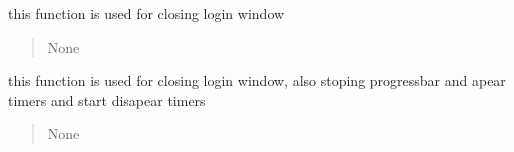 \documentclass[letterpaper,10pt,english]{sphinxmanual}
\begin{document}
\begin{savenotes}
\begin{fulllineitems}
\begin{savenotes}
\begin{fulllineitems}
\end{fulllineitems}\end{savenotes}


\begin{savenotes}\begin{fulllineitems}
\label{\detokenize{setting/notif_UI:oxin.notif_UI.UI_main_window.check_appear_done}}
\pysigstartsignatures
{}
\pysigstopsignatures
\end{fulllineitems}\end{savenotes}


\begin{savenotes}\begin{fulllineitems}
\label{\detokenize{setting/notif_UI:oxin.notif_UI.UI_main_window.close_win}}
\pysigstartsignatures
{}
\pysigstopsignatures
\sphinxAtStartPar
this function is used for closing login window
\begin{quote}\begin{description}
\sphinxAtStartPar
None

\end{description}\end{quote}

\end{fulllineitems}\end{savenotes}


\begin{savenotes}\begin{fulllineitems}
\label{\detokenize{setting/notif_UI:oxin.notif_UI.UI_main_window.close_win_2}}
\pysigstartsignatures
{}
\pysigstopsignatures
\sphinxAtStartPar
this function is used for closing login window, also stoping progressbar and apear timers and start disapear timers
\begin{quote}\begin{description}
\sphinxAtStartPar
None


\end{description}
\end{quote}
\end{fulllineitems}
\end{savenotes}
\end{fulllineitems}
\end{savenotes}
\end{document}

